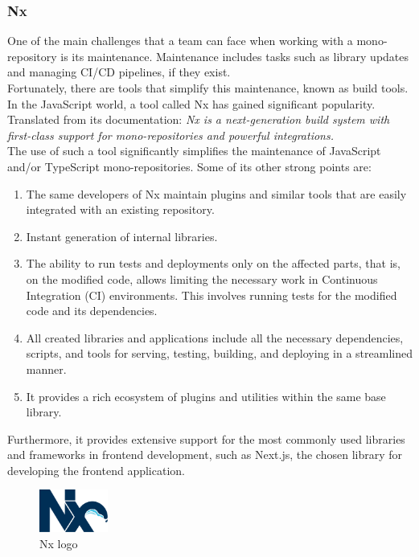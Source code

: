 \documentclass[../memory.tex]{subfiles}
\begin{document}
\subsubsection{Nx}
One of the main challenges that a team can face when working with a
mono-repository is its maintenance. Maintenance includes tasks such as library
updates and managing CI/CD pipelines, if they exist.
\\
Fortunately, there are tools that simplify this maintenance, known as build
tools. In the JavaScript world, a tool called Nx has gained significant
popularity. Translated from its documentation: \emph{Nx is a next-generation build
	system with first-class support for mono-repositories and powerful
	integrations.}\cite{nx}
\\[8pt]
The use of such a tool significantly simplifies the maintenance of JavaScript
and/or TypeScript mono-repositories. Some of its other strong points are:
\begin{enumerate}
	\item The same developers of Nx maintain plugins and similar tools that are
	      easily integrated with an existing repository.
	\item Instant generation of internal libraries.
	\item The ability to run tests and deployments only on the affected parts,
	      that is, on the modified code, allows limiting the necessary work in
	      Continuous Integration (CI) environments. This involves running tests for
	      the modified code and its dependencies.
	\item All created libraries and applications include all the necessary
	      dependencies, scripts, and tools for serving, testing, building, and
	      deploying in a streamlined manner.
	\item It provides a rich ecosystem of plugins and utilities within the same
	      base library.
\end{enumerate}
Furthermore, it provides extensive support for the most commonly used libraries
and frameworks in frontend development, such as Next.js, the chosen library for
developing the frontend application.
\begin{figure}[H]
	\centering
	\includegraphics[width=0.2\textwidth]{./assets/logos/nx-logo.png}
	\caption{Nx logo}
\end{figure}
\end{document}
